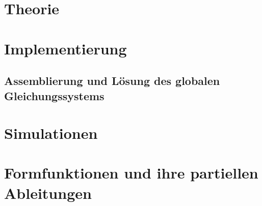 \documentclass[12pt,a4paper]{scrartcl}
\begin{document}
\section{Theorie}







\section{Implementierung}








\subsection{Assemblierung und Lösung des globalen Gleichungssystems}
\label{sec:assembling}


\newpage
\section{Simulationen}


\appendix
\section{Formfunktionen und ihre partiellen Ableitungen}





\newpage
{}

\end{document}
